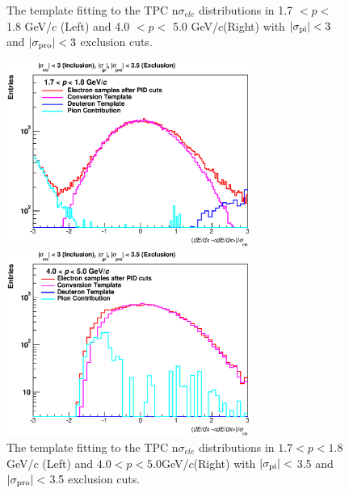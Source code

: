 {\begin{figure}[!h]
\begin{minipage}{0.5\hsize}
\begin{center}
  \end{center}
 \end{minipage}
  \caption{The template fitting to the TPC n$\sigma_{ele}$ distributions in 1.7 $<p<$ 1.8 GeV/$c$ (Left) and 4.0 $<p<$ 5.0 GeV/$c$(Right) with $|\sigma_{\rm{pi}}|<3$ and $|\sigma_{\rm{pro}}|<3$ exclusion cuts.}
  \label{fig_4_tpcnsigmacut3}
\end{figure}
\begin{figure}[!h]
 \begin{minipage}{0.5\hsize}
  \begin{center}
 	\includegraphics[width=8cm]{chap4/figure/PID/TPCNSigma_AfterExclusion3p5_MB_1p7_1p8.eps}
  \end{center}
 \end{minipage}
 \begin{minipage}{0.5\hsize}
  \begin{center}
	 \includegraphics[width=8cm]{chap4/figure/PID/TPCNSigma_AfterExclusion3p5_MB_4_5.eps}
  \end{center}
 \end{minipage}
   \caption{The template fitting to the TPC n$\sigma_{ele}$ distributions in $1.7<p<1.8$ GeV/$c$ (Left) and $4.0<p<5.0$GeV/$c$(Right) with $|\sigma_{\rm{pi}}|<$ 3.5 and $|\sigma_{\rm{pro}}| < $ 3.5 exclusion cuts.}
  \label{fig_4_tpcnsigmacut3p5}
\end{figure}

}

